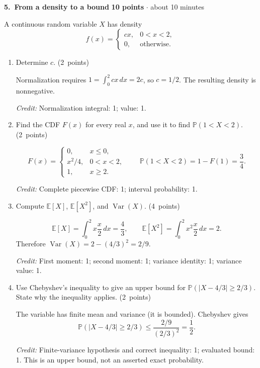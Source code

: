 \documentclass[11pt,letterpaper]{article}
\newcommand{\Prob}{\mathbb P}
\newcommand{\E}{\mathbb E}
\DeclareMathOperator{\Var}{Var}
\newcommand{\partpts}[1]{\unskip\nobreak\hspace{.3em}%
  \mbox{\small\color{muted}(#1 points)}}
\newcommand{\credit}[1]{\par{\footnotesize\color{muted}\textit{Credit:} #1}}
\newcommand{\problem}[4]{\par\addvspace{8pt}%
  {\large\bfseries\color{indigo}#1.\ #2}\hfill
  {\small\color{muted}\textbf{#3 points} $\cdot$ about #4 minutes}\par\nobreak}
\begin{document}
\newpage
\problem{5}{From a density to a bound}{10}{10}
A continuous random variable $X$ has density
\[
f(x)=\begin{cases}cx,&0<x<2,\\0,&\text{otherwise}.
\end{cases}
\]
\begin{enumerate}
\item Determine $c$. \partpts{2}
\begin{solution}[.9in]
Normalization requires $1=\int_0^2 cx\,dx=2c$, so $c=1/2$.
The resulting density is nonnegative.
\credit{Normalization integral: 1; value: 1.}
\end{solution}
\item Find the CDF $F(x)$ for every real $x$, and use it to find
$\Prob(1<X<2)$. \partpts{2}
\begin{solution}[1.15in]
\[
F(x)=\begin{cases}0,&x\le0,\\x^2/4,&0<x<2,\\1,&x\ge2.
\end{cases}
\qquad \Prob(1<X<2)=1-F(1)=\frac34.
\]
\credit{Complete piecewise CDF: 1; interval probability: 1.}
\end{solution}
\item Compute $\E[X]$, $\E[X^2]$, and $\Var(X)$. \partpts{4}
\begin{solution}[1.4in]
\[
\E[X]=\int_0^2 x\frac{x}{2}\,dx=\frac43,\qquad
\E[X^2]=\int_0^2 x^2\frac{x}{2}\,dx=2.
\]
Therefore $\Var(X)=2-(4/3)^2=2/9$.
\credit{First moment: 1; second moment: 1;
variance identity: 1; variance value: 1.}
\end{solution}
\item Use Chebyshev's inequality to give an upper bound for
$\Prob(|X-4/3|\ge2/3)$. State why the inequality applies.
\partpts{2}
\begin{solution}[1in]
The variable has finite mean and variance (it is bounded). Chebyshev gives
\[
\Prob(|X-4/3|\ge2/3)\le\frac{2/9}{(2/3)^2}=\frac12.
\]
\credit{Finite-variance hypothesis and correct inequality: 1;
evaluated bound: 1. This is an upper bound, not an asserted exact probability.}
\end{solution}
\end{enumerate}
\label{quiz-last-page}
\end{document}
